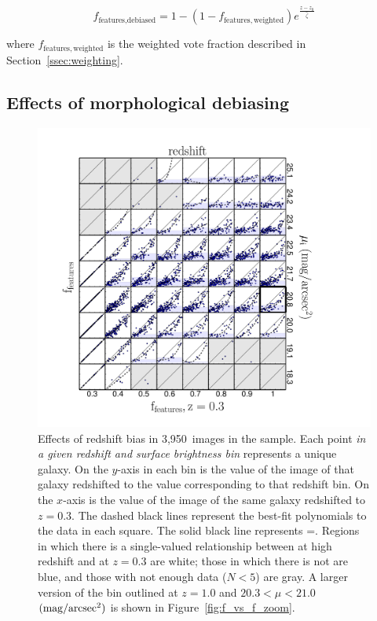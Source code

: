 \documentclass[twocolumn]{aastex6}
\begin{document}
\begin{equation}
f_\textrm{features,debiased} = 1 - (1 - f_\mathrm{features,weighted})e^{\frac{z-z_0}{\hat\zeta}}
\label{eqn:fzeta_mod}
\end{equation}

\noindent where $f_\mathrm{features,weighted}$ is the weighted vote fraction
described in Section~\ref{ssec:weighting}.

\subsection{Effects of morphological debiasing}\label{ssec:zeta_results}

\begin{figure}
\centering
\includegraphics[width=\textwidth]{figures/p_vs_p_SB_redshift.pdf}
\caption{Effects of redshift bias in 3,950~images in the \ferengi{} sample.
Each point \emph{in a given redshift and surface brightness bin} represents a
unique galaxy. On the $y$-axis in each bin is the \ffeatures{} value of the
image of that galaxy redshifted to the value corresponding to that redshift
bin. On the $x$-axis is the \ffeatures{} value of the image of the same galaxy
redshifted to $z=0.3$. The dashed black lines represent the best-fit
polynomials to the data in each square. The solid black line represents
\ffeaturesz=\ffeaturesrest. Regions in which there is a single-valued
relationship between \ffeatures{} at high redshift and at $z=0.3$ are white;
those in which there is not are blue, and those with not enough data ($N<5$)
are gray. A larger version of the bin outlined at $z=1.0$ and $20.3 < \mu <
21.0$ $\rm (mag/arcsec^2)$ is shown in Figure~\ref{fig:f_vs_f_zoom}.}
\label{fig:f_vs_f}
\end{figure} 
\end{document}
